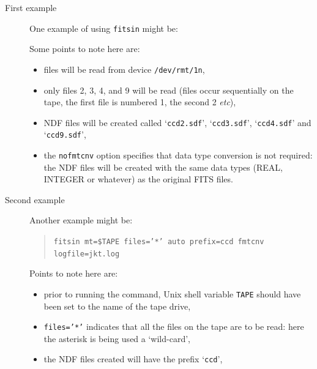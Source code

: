 \documentclass[twoside,11pt]{starlink}
\begin{document}
\begin{description}

  \item[First example] One example of using \texttt{fitsin} might be:

\begin{terminalv}
\end{terminalv}

   Some points to note here are:

  \begin{itemize}

    \item files will be read from device \texttt{/dev/rmt/1n},

    \item only files 2, 3, 4, and 9 will be read (files occur sequentially
     on the tape, the first file is numbered 1, the second 2 \emph{etc}),

    \item NDF files will be created called `\texttt{ccd2.sdf}',
     `\texttt{ccd3.sdf}', `\texttt{ccd4.sdf}' and `\texttt{ccd9.sdf}',

    \item the \texttt{nofmtcnv} option specifies that data type conversion
     is not required: the NDF files will be created with the same data
     types (REAL, INTEGER or whatever) as the original FITS files.

  \end{itemize}

  \item[Second example] Another example might be:

  \begin{quote}
   \texttt{fitsin mt=\$TAPE files='*' auto prefix=ccd fmtcnv logfile=jkt.log}
  \end{quote}

   Points to note here are:

  \begin{itemize}

    \item prior to running the command, Unix shell variable \texttt{TAPE}
     should have been set to the name of the tape drive,

    \item \texttt{files='*'} indicates that all the files on the tape are
     to be read: here the asterisk is being used a `wild-card',

    \item the NDF files created will have the prefix `\texttt{ccd}',


\end{itemize}
\end{description}
\end{document}
